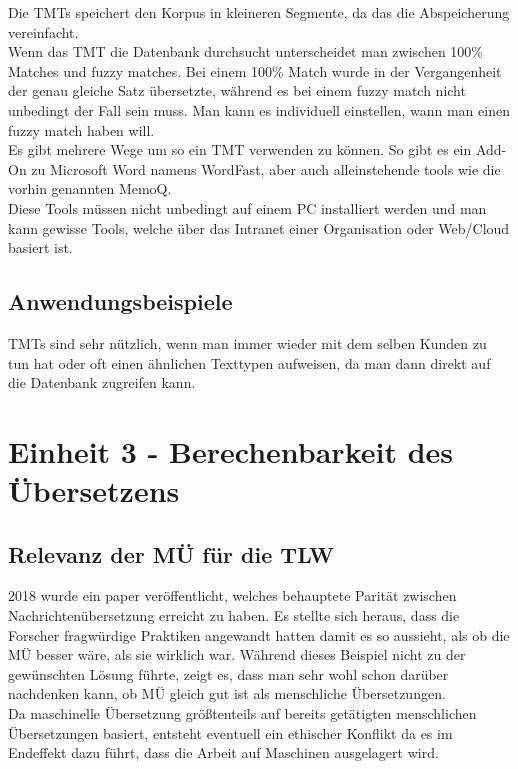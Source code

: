\documentclass{article}
\begin{document}
	Die TMTs speichert den Korpus in kleineren Segmente, da das die Abspeicherung vereinfacht. \\
	Wenn das TMT die Datenbank durchsucht unterscheidet man zwischen 100\% Matches und fuzzy matches. Bei einem 100\% Match wurde in der Vergangenheit der genau gleiche Satz übersetzte, während es bei einem fuzzy match nicht unbedingt der Fall sein muss. Man kann es individuell einstellen, wann man einen fuzzy match haben will. \\
	Es gibt mehrere Wege um so ein TMT verwenden zu können. So gibt es ein Add-On zu Microsoft Word namens WordFast, aber auch alleinstehende tools wie die vorhin genannten MemoQ. \\
	Diese Tools müssen nicht unbedingt auf einem PC installiert werden und man kann gewisse Tools, welche über das Intranet einer Organisation oder Web/Cloud basiert ist. \\
	\subsection{Anwendungsbeispiele}
	TMTs sind sehr nützlich, wenn man immer wieder mit dem selben Kunden zu tun hat oder oft einen ähnlichen Texttypen aufweisen, da man dann direkt auf die Datenbank zugreifen kann. \\

	\section{Einheit 3 - Berechenbarkeit des Übersetzens}
	\subsection{Relevanz der MÜ für die TLW}
	2018 wurde ein paper veröffentlicht, welches behauptete Parität zwischen Nachrichtenübersetzung erreicht zu haben. Es stellte sich heraus, dass die Forscher fragwürdige Praktiken angewandt hatten damit es so aussieht, als ob die MÜ besser wäre, als sie wirklich war. Während dieses Beispiel nicht zu der gewünschten Lösung führte, zeigt es, dass man sehr wohl schon darüber nachdenken kann, ob MÜ gleich gut ist als menschliche Übersetzungen. \\
	Da maschinelle Übersetzung größtenteils auf bereits getätigten menschlichen Übersetzungen basiert, entsteht eventuell ein ethischer Konflikt da es im Endeffekt dazu führt, dass die Arbeit auf Maschinen ausgelagert wird. \\
\end{document}

